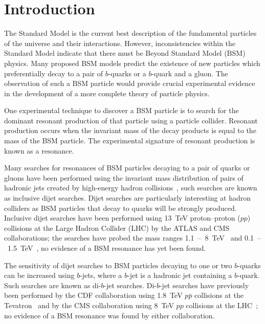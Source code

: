 \chapter{Introduction}
\label{sec:int}
The Standard Model is the current best description of the fundamental particles of the universe and their interactions.
However, inconsistencies within the Standard Model indicate that
there must be Beyond Standard Model (BSM) physics.
Many proposed BSM models predict the existence of new particles
which preferentially decay to a pair of $b$-quarks or a $b$-quark and a gluon.
The observation of such a BSM particle would provide crucial experimental
evidence in the development of a more complete theory of particle physics.


One experimental technique to discover a BSM particle is to search for
the dominant resonant production of that particle using a particle collider.
Resonant production occurs when the invariant mass of the decay products is equal to the mass of the BSM particle.
The experimental signature of resonant production is known as a resonance.

Many searches for resonances of BSM particles decaying to a pair of quarks or gluons
have been performed using the invariant mass distribution of pairs of hadronic jets created
by high-energy hadron collisions~\cite{theo-dijet_harris}, such searches are known as inclusive dijet searches.
Dijet searches are particularly interesting at hadron colliders as BSM particles
that decay to quarks will be strongly produced.
Inclusive dijet searches have been performed using 13~TeV \mbox{proton--proton} ($pp$) collisions at the
Large Hadron Collider (LHC) by the ATLAS and CMS collaborations;
the searches have probed the mass ranges 1.1~--~8~TeV~\cite{dijet-mori16_paper,dijet-mori17_paper,dijet-cms}
and 0.1~--~1.5~TeV~\cite{dijet-isr,dijet-TLA,dijet-isr_cms},
no evidence of a BSM resonance has yet been found.

The sensitivity of dijet searches to BSM particles decaying to one or two $b$-quarks can be increased
using $b$-jets, where a $b$-jet is a hadronic jet containing a $b$-quark.
Such searches are known as di-$b$-jet searches.
Di-$b$-jet searches have previously been performed by
the CDF collaboration using 1.8~TeV $p\bar{p}$ collisions at the Tevatron~\cite{dibjet-cdf}
and by the CMS collaboration using 8~TeV $pp$ collisions at the LHC~\cite{dibjet-cms};
no evidence of a BSM resonance was found by either collaboration.


